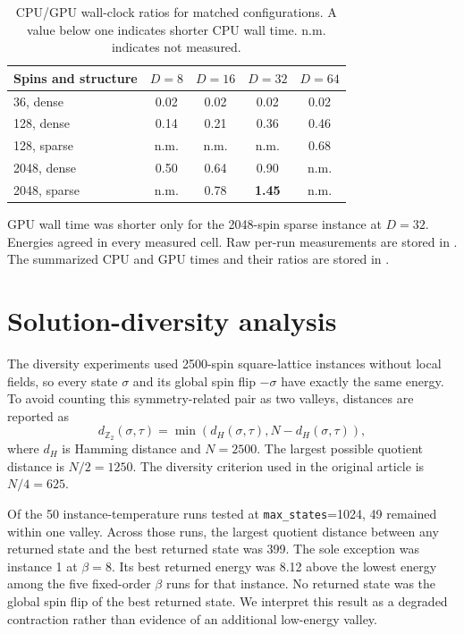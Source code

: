 \documentclass[preprint,12pt,a4paper]{elsarticle}
\begin{document}
\begin{table}[htbp]
\small
\centering
\caption{CPU/GPU wall-clock ratios for matched configurations. A value below
one indicates shorter CPU wall time. n.m. indicates not measured.}
\label{tab:supp-crossover}
\begin{tabular}{@{}lcccc@{}}
\toprule
Spins and structure & $D{=}8$ & $D{=}16$ & $D{=}32$ & $D{=}64$ \\
\midrule
36, dense     & 0.02 & 0.02 & 0.02 & 0.02 \\
128, dense    & 0.14 & 0.21 & 0.36 & 0.46 \\
128, sparse   & n.m. & n.m. & n.m. & 0.68 \\
2048, dense   & 0.50 & 0.64 & 0.90 & n.m. \\
2048, sparse  & n.m. & 0.78 & \textbf{1.45} & n.m. \\
\bottomrule
\end{tabular}
\end{table}

GPU wall time was shorter only for the 2048-spin sparse instance at $D=32$.
Energies agreed in every measured cell. Raw per-run measurements are stored in
. The summarized CPU and GPU times and their ratios
are stored in .
\FloatBarrier

\section{Solution-diversity analysis}
\label{sec:supp-diversity}

The diversity experiments used 2500-spin square-lattice instances without local
fields, so every state $\sigma$ and its global spin flip $-\sigma$ have exactly
the same energy. To avoid counting this symmetry-related pair as two valleys,
distances are reported as
\[
    d_{\mathbb{Z}_2}(\sigma,\tau)
    = \min\!\left(d_H(\sigma,\tau),N-d_H(\sigma,\tau)\right),
\]
where $d_H$ is Hamming distance and $N=2500$. The largest possible quotient
distance is $N/2=1250$. The diversity criterion used in the original article is
$N/4=625$.

Of the 50 instance-temperature runs tested at \texttt{max\_states}=1024, 49
remained within one valley. Across those runs, the largest quotient distance
between any returned state and the best returned state was 399. The sole
exception was instance 1 at $\beta=8$. Its best returned energy was 8.12 above
the lowest energy among the five fixed-order $\beta$ runs for that instance. No
returned state was the global spin flip of the best returned state. We interpret
this result as a degraded contraction rather than evidence of an additional
low-energy valley.
\end{document}
